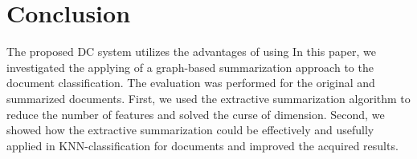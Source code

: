 \documentclass{sigchi}
\begin{document}
\section{Conclusion}\label{sectionConclusion}
The proposed DC system utilizes the advantages of using
In this paper, we investigated the applying of a graph-based summarization approach to the document classification. 
The evaluation was performed for the original and summarized documents. 
First, we used the extractive summarization algorithm to reduce the number of features and solved the curse of dimension. 
Second, we showed how the extractive summarization could be effectively and usefully applied in KNN-classification for documents and improved the acquired results.


%
%
%
%
%
\balance{}




\end{document}
